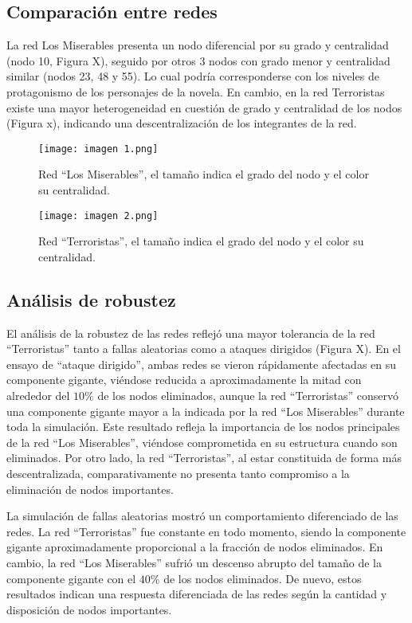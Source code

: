\documentclass{article}
\begin{document}
\subsection{Comparación entre redes}

La red Los Miserables presenta un nodo diferencial por su grado y centralidad (nodo 10, Figura X), seguido por otros 3 nodos con grado menor y centralidad similar (nodos 23, 48 y 55). Lo cual podría corresponderse con los niveles de protagonismo de los personajes de la novela. En cambio, en la red Terroristas existe una mayor heterogeneidad en cuestión de grado y centralidad de los nodos (Figura x), indicando una descentralización de los integrantes de la red.


\begin{figure}[h]
  \centering
  \texttt{[image: imagen 1.png]}
  \caption{Red “Los Miserables”, el tamaño indica el grado del nodo y el color su centralidad.}
  \label{fig:terroristas}
\end{figure}



\begin{figure}[h]
  \centering
  \texttt{[image: imagen 2.png]}
  \caption{Red “Terroristas”, el tamaño indica el grado del nodo y el color su centralidad.}
  \label{fig:terroristas}
\end{figure}

\subsection{Análisis de robustez}



El análisis de la robustez de las redes reflejó una mayor tolerancia de la red “Terroristas” tanto a fallas aleatorias como a ataques dirigidos (Figura X). En el ensayo de “ataque dirigido”, ambas redes se vieron rápidamente afectadas en su componente gigante, viéndose reducida a aproximadamente la mitad con alrededor del \(10\%\) de los nodos eliminados, aunque la red “Terroristas” conservó una componente gigante mayor a la indicada por la red “Los Miserables” durante toda la simulación. Este resultado refleja la importancia de los nodos principales de la red “Los Miserables”, viéndose comprometida en su estructura cuando son eliminados. Por otro lado, la red “Terroristas”, al estar constituida de forma más descentralizada, comparativamente no presenta tanto compromiso a la eliminación de nodos importantes.

La simulación de fallas aleatorias mostró un comportamiento diferenciado de las redes. La red “Terroristas” fue constante en todo momento, siendo la componente gigante aproximadamente proporcional a la fracción de nodos eliminados. En cambio, la red “Los Miserables” sufrió un descenso abrupto del tamaño de la componente gigante con el \(40\%\) de los nodos eliminados. De nuevo, estos resultados indican una respuesta diferenciada de las redes según la cantidad y disposición de nodos importantes.
\end{document}
